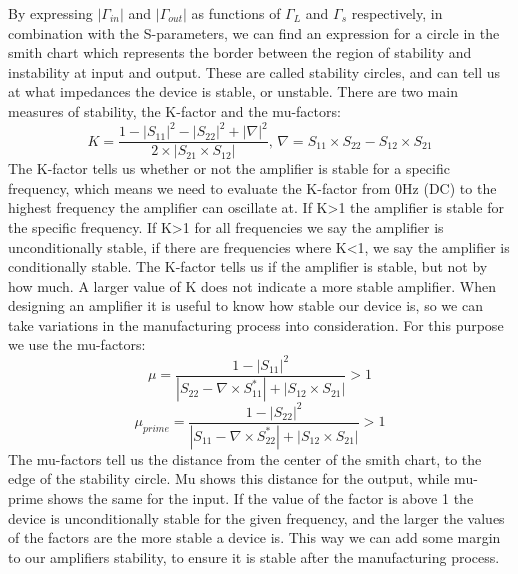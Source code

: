 By expressing $|\Gamma_{in}|$ and $|\Gamma_{out}|$ as functions of $\Gamma_L$  and $\Gamma_s$ respectively, in combination with the S-parameters, we can find an expression for a circle in the smith chart which represents the border between the region of stability and instability at input and output. These are called stability circles, and can tell us at what impedances the device is stable, or unstable.
There are two main measures of stability, the K-factor and the mu-factors:
\begin{equation}
K=\frac{1-|S_{11}|^2-|S_{22}|^2+|\nabla |^2}{2\times |S_{21}\times S_{12}|},\, \nabla =S_{11}\times S_{22}-S_{12}\times S_{21}
\end{equation}
The K-factor tells us whether or not the amplifier is stable for a specific frequency, which means we need to evaluate the K-factor from 0Hz (DC) to the highest frequency the amplifier can oscillate at. If K>1 the amplifier is stable for the specific frequency. If K>1 for all frequencies we say the amplifier is unconditionally stable, if there are frequencies where K<1, we say the amplifier is conditionally stable.  The K-factor tells us if the amplifier is stable, but not by how much. A larger value of K does not indicate a more stable amplifier. When designing an amplifier it is useful to know how stable our device is, so we can take variations in the manufacturing process into consideration. For this purpose we use the mu-factors:
\begin{equation}
\mu=\frac{1-|S_{11}|^2}{|S_{22}-\nabla \times S_{11}^*|+|S_{12}\times S_{21}|}>1
\end{equation}
\begin{equation}
\mu_{prime}=\frac{1-|S_{22}|^2}{|S_{11}-\nabla \times S_{22}^*|+|S_{12}\times S_{21}|}>1
\end{equation}
The mu-factors tell us the distance from the center of the smith chart, to the edge of the stability circle. Mu shows this distance for the output, while mu-prime shows the same for the input. If the value of the factor is above 1 the device is unconditionally stable for the given frequency, and the larger the values of the factors are the more stable a device is. This way we can add some margin to our amplifiers stability, to ensure it is stable after the manufacturing process.

